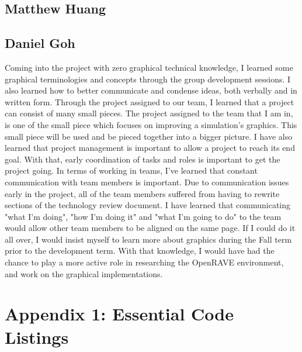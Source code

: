 \documentclass[10pt,journal,compsoc,draftclsnofoot]{IEEEtran}
\begin{document}
\begin{flushleft}
\subsection{Matthew Huang}


\subsection{Daniel Goh}
Coming into the project with zero graphical technical knowledge, I learned some graphical terminologies and concepts through the group development sessions.
I also learned how to better communicate and condense ideas, both verbally and in written form. 
Through the project assigned to our team, I learned that a project can consist of many small pieces.
The project assigned to the team that I am in, is one of the small piece which focuses on improving a simulation's graphics.
This small piece will be used and be pieced together into a bigger picture.
I have also learned that project management is important to allow a project to reach its end goal.
With that, early coordination of tasks and roles is important to get the project going.
In terms of working in teams, I've learned that constant communication with team members is important.
Due to communication issues early in the project, all of the team members suffered from having to rewrite sections of the technology review document.
I have learned that communicating "what I'm doing", "how I'm doing it" and "what I'm going to do" to the team would allow other team members to be aligned on the same page.
If I could do it all over, I would insist myself to learn more about graphics during the Fall term prior to the development term.
With that knowledge, I would have had the chance to play a more active role in researching the OpenRAVE environment, and work on the graphical implementations.

\newpage

\section{Appendix 1: Essential Code Listings}



\end{flushleft}
\end{document}
